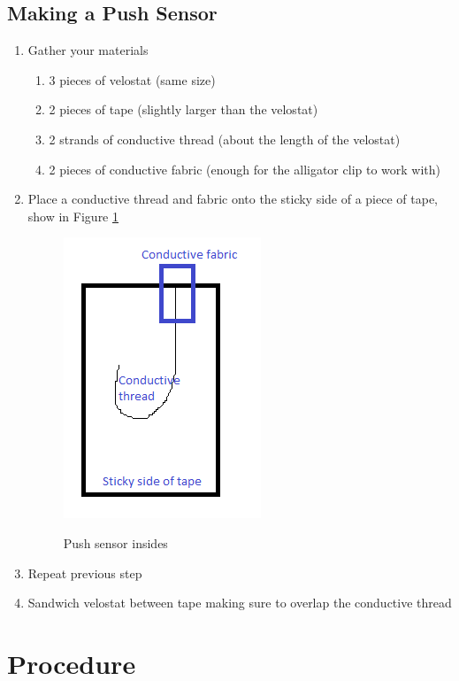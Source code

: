 \documentclass[12pt,letterpaper,oneside]{article}
\begin{document}
	\subsection{Making a Push Sensor}
		\begin{enumerate}
				\item Gather your materials
					\begin{enumerate}
						\item 3 pieces of velostat (same size)
						\item 2 pieces of tape (slightly larger than the velostat)
						\item 2 strands of conductive thread (about the length of the velostat)
						\item 2 pieces of conductive fabric (enough for the alligator clip to work with)
					\end{enumerate}
				\item Place a conductive thread and fabric onto the sticky side of a piece of tape, show in Figure \ref{fig:stickyTape}
					\begin{figure} 
						\centering
						\caption{Push sensor insides}
						\includegraphics[scale=.6]{images/sensor.png}		
						\label{fig:stickyTape}
					\end{figure}	
				\item Repeat previous step
				\item Sandwich velostat between tape making sure to overlap the conductive thread
		\end{enumerate}						

\section{Procedure}
		
\end{document}
